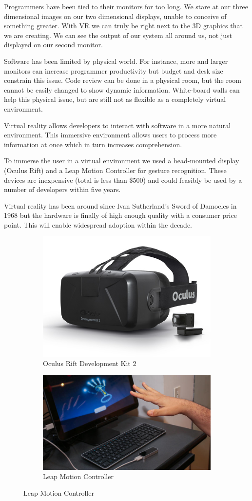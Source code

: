 \documentclass{acm_proc_article-sp}
\begin{document}
Programmers have been tied to their monitors for too long. We stare at our three dimensional images on our two dimensional displays, unable to conceive of something greater. With VR we can truly be right next to the 3D graphics that we are creating. We can see the output of our system all around us, not just displayed on our second monitor.

Software has been limited by physical world. For instance, more and larger monitors can increase programmer productivity but budget and desk size constrain this issue.
Code review can be done in a physical room, but the room cannot be easily changed to show dynamic information. White-board walls can help this physical issue, but are still not as flexible as a completely virtual environment.

Virtual reality allows developers to interact with software in a more natural environment. This immersive environment allows users to process more information at once which in turn increases comprehension.

To immerse the user in a virtual environment we used a head-mounted display (Oculus Rift) and a Leap Motion Controller for gesture recognition. These devices are inexpensive (total is less than \$500) and could feasibly be used by a number of developers within five years.

Virtual reality has been around since Ivan Sutherland's Sword of Damocles in 1968 but the hardware is finally of high enough quality with a consumer price point. This will enable widespread adoption within the decade.

\begin{figure}[ht!]
\centering
\begin{subfigure}{.5\columnwidth}
	\centering
	\includegraphics[width=.4\linewidth]{figures/dk2}
	\caption{Oculus Rift Development Kit 2 \label{fig:rift}}
\end{subfigure}%
\begin{subfigure}{.5\columnwidth}
  \centering
  \includegraphics[width=.4\linewidth]{figures/LeapAndKeyboard}
  \caption{Leap Motion Controller \label{fig:leap}}
\end{subfigure}
\end{figure}
\end{document}
